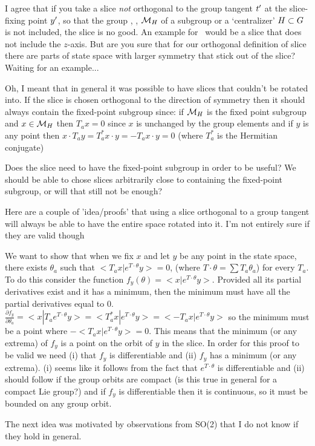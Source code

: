\begin{description}
\item[2010-08-16 PC]
I agree that if you take a slice \emph{not} orthogonal to the group
tangent $t'_{}$ at the slice-fixing point ${y'}$,
so that the group {\fixedsp}, \ie,
${\cal M}_H$ of a subgroup or a `centralizer' $H \subset G$
 is not included, the slice is no
good. An example for \cLe\ would be a slice
that does not include the $z$-axis.
But are you sure that for our orthogonal definition
of slice there are parts of state space with larger symmetry
that stick out of the slice? Waiting for an example...

\item[2010-08-17 SF]
Oh, I meant that in general it was possible to have slices that couldn't be rotated into. If the slice is chosen orthogonal to the direction of symmetry then it should always contain the fixed-point subgroup since: if ${\cal M}_H$ is the fixed point subgroup and $x \in {\cal M}_H$ then $T_a x=0$ since $x$ is unchanged by the group elements and if $y$ is any point then $x \cdot T_a y=T_a^* x \cdot y=-T_a x \cdot y=0$ (where $T_a^*$ is the Hermitian conjugate)

Does the slice need to have the fixed-point subgroup in order to be useful? We should be able to chose slices arbitrarily close to containing the fixed-point subgroup, or will that still not be enough?

\item[2010-08-18 SF]
Here are a couple of 'idea/proofs' that using a slice orthogonal to a group tangent will always be able to have the entire space rotated into it. I'm not entirely sure if they are valid though
    \item
We want to show that when we fix $x$ and let $y$ be any point in the state space, there exists $\theta_a$ such that $<T_a x|e^{T\cdot \theta}y>=0$, (where $T \cdot \theta=\sum T_a \theta_a$) for every $T_a$.
To do this consider the function $f_y(\theta)=<x|e^{T \cdot \theta} y>$. Provided all its partial derivatives exist and it has a minimum, then the minimum must have all the partial derivatives equal to 0. $\frac{\partial f_y}{\partial \theta_a}=<x|T_a e^{T \cdot \theta} y>=<T_a^* x|e^{T \cdot \theta} y>=<-T_a x|e^{T \cdot \theta} y>$ so the minimum must be a point where $-<T_a x|e^{T \cdot \theta} y>=0$. This means that the minimum (or any extrema) of $f_y$ is a point on the orbit of $y$ in the slice.
In order for this proof to be valid we need (i) that $f_y$ is differentiable and (ii) $f_y$ has a minimum (or any extrema). (i) seems like it follows from the fact that $e^{T \cdot \theta}$ is differentiable and (ii) should follow if the group orbits are compact (is this true in general for a compact Lie group?) and if $f_y$ is differentiable then it is continuous, so it must be bounded on any group orbit.
    \item
The next idea was motivated by observations from SO(2) that I do not know if they hold in general.


\end{description}
